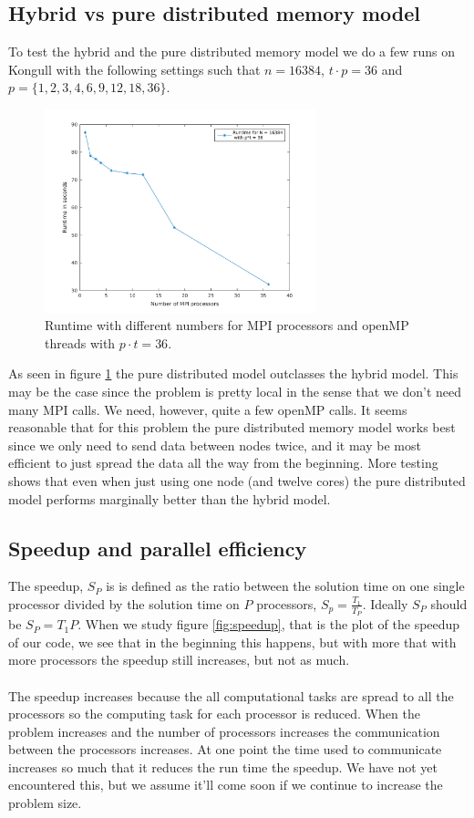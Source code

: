 \subsection*{Hybrid vs pure distributed memory model}
To test the hybrid and the pure distributed memory model we do a few runs on Kongull with the following settings such that $n = 16384$,  $t\cdot p = 36$ and $p = \{1, 2, 3, 4, 6, 9, 12, 18, 36\}$.
\begin{figure}
\centering
\includegraphics[width=0.7\textwidth]{./figures/pt36}
\caption{Runtime with different numbers for MPI processors and openMP threads with $p\cdot t = 36$.}
\label{fig:runtime}
\end{figure}
As seen in figure \ref{fig:runtime} the pure distributed model outclasses the hybrid model. This may be the case since the problem is pretty local in the sense that we don't need many MPI calls. We need, however, quite a few openMP calls. It seems reasonable that for this problem the pure distributed memory model works best since we only need to send data between nodes twice, and it may be most efficient to just spread the data all the way from the beginning. More testing shows that even when just using one node (and twelve cores) the pure distributed model performs marginally better than the hybrid model.


\subsection*{Speedup and parallel efficiency}
The speedup, $S_P$ is is defined as the ratio between the solution time on one single processor divided by the solution time on $P$ processors, $S_p=\frac{T_1}{T_P}$. Ideally $S_P$ should be $S_P=T_1P$. When we study figure \ref{fig:speedup}, that is the plot of the speedup of our code, we see that in the beginning this happens, but with more that with more processors the speedup still increases, but not as much.
\\ \\
The speedup increases because the all computational tasks are spread to all the processors so the computing task for each processor is reduced. When the problem increases and the number of processors increases the communication between the processors increases. At one point the time used to communicate increases so much that it reduces the run time the speedup. We have not yet encountered this, but we assume it'll come soon if we continue to increase the problem size.

